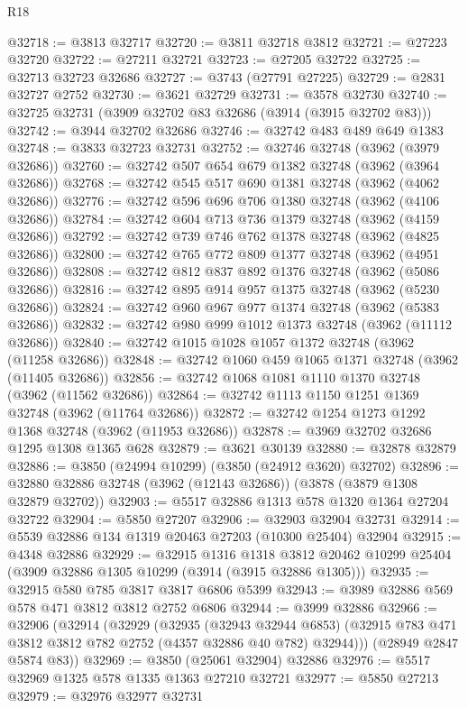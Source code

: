 \begin{lexlean}{R18}
\begin{coremodule}
@32718 := @3813 @32717
@32720 := @3811 @32718 @3812
@32721 := @27223 @32720
@32722 := @27211 @32721
@32723 := @27205 @32722
@32725 := @32713 @32723 @32686
@32727 := @3743 (@27791 @27225)
@32729 := @2831 @32727 @2752
@32730 := @3621 @32729
@32731 := @3578 @32730
@32740 := @32725 @32731 (@3909 @32702 @83 @32686 (@3914 (@3915 @32702 @83)))
@32742 := @3944 @32702 @32686
@32746 := @32742 @483 @489 @649 @1383
@32748 := @3833 @32723 @32731
@32752 := @32746 @32748 (@3962 (@3979 @32686))
@32760 := @32742 @507 @654 @679 @1382 @32748 (@3962 (@3964 @32686))
@32768 := @32742 @545 @517 @690 @1381 @32748 (@3962 (@4062 @32686))
@32776 := @32742 @596 @696 @706 @1380 @32748 (@3962 (@4106 @32686))
@32784 := @32742 @604 @713 @736 @1379 @32748 (@3962 (@4159 @32686))
@32792 := @32742 @739 @746 @762 @1378 @32748 (@3962 (@4825 @32686))
@32800 := @32742 @765 @772 @809 @1377 @32748 (@3962 (@4951 @32686))
@32808 := @32742 @812 @837 @892 @1376 @32748 (@3962 (@5086 @32686))
@32816 := @32742 @895 @914 @957 @1375 @32748 (@3962 (@5230 @32686))
@32824 := @32742 @960 @967 @977 @1374 @32748 (@3962 (@5383 @32686))
@32832 := @32742 @980 @999 @1012 @1373 @32748 (@3962 (@11112 @32686))
@32840 := @32742 @1015 @1028 @1057 @1372 @32748 (@3962 (@11258 @32686))
@32848 := @32742 @1060 @459 @1065 @1371 @32748 (@3962 (@11405 @32686))
@32856 := @32742 @1068 @1081 @1110 @1370 @32748 (@3962 (@11562 @32686))
@32864 := @32742 @1113 @1150 @1251 @1369 @32748 (@3962 (@11764 @32686))
@32872 := @32742 @1254 @1273 @1292 @1368 @32748 (@3962 (@11953 @32686))
@32878 := @3969 @32702 @32686 @1295 @1308 @1365 @628
@32879 := @3621 @30139
@32880 := @32878 @32879
@32886 := @3850 (@24994 @10299) (@3850 (@24912 @3620) @32702)
@32896 := @32880 @32886 @32748 (@3962 (@12143 @32686)) (@3878 (@3879 @1308 @32879 @32702))
@32903 := @5517 @32886 @1313 @578 @1320 @1364 @27204 @32722
@32904 := @5850 @27207
@32906 := @32903 @32904 @32731
@32914 := @5539 @32886 @134 @1319 @20463 @27203 (@10300 @25404) @32904
@32915 := @4348 @32886
@32929 := @32915
    @1316
    @1318
    @3812
    @20462
    @10299
    @25404
    (@3909 @32886 @1305 @10299 (@3914 (@3915 @32886 @1305)))
@32935 := @32915 @580 @785 @3817 @3817 @6806 @5399
@32943 := @3989 @32886 @569 @578 @471 @3812 @3812 @2752 @6806
@32944 := @3999 @32886
@32966 := @32906
    (@32914
      (@32929
        (@32935
          (@32943 @32944 @6853)
          (@32915 @783 @471 @3812 @3812 @782 @2752 (@4357 @32886 @40 @782) @32944)))
      (@28949 @2847 @5874 @83))
@32969 := @3850 (@25061 @32904) @32886
@32976 := @5517 @32969 @1325 @578 @1335 @1363 @27210 @32721
@32977 := @5850 @27213
@32979 := @32976 @32977 @32731

\end{coremodule}
\end{lexlean}
